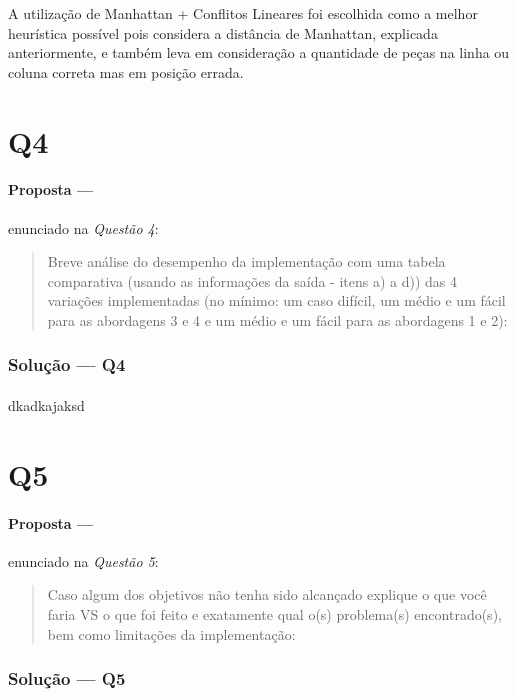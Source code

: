 \documentclass[12pt]{article}
\begin{document}
A utilização de Manhattan + Conflitos Lineares foi escolhida como a melhor heurística possível pois considera a distância de Manhattan, explicada anteriormente, e também leva em consideração a quantidade de peças na linha ou coluna correta mas em posição errada.

\section{Q4}

\paragraph{Proposta ---} enunciado na \textit{Questão 4}:

\begin{quote}
Breve análise do desempenho da implementação com uma tabela comparativa (usando as informações da saída - itens a) a d)) das 4 variações implementadas (no mínimo: um caso difícil, um médio e um fácil para as abordagens 3 e 4 e um médio e um fácil para as abordagens 1 e 2):
\end{quote}

\subsubsection{Solução --- \textbf{Q4}}

\paragraph{}
dkadkajaksd

\section{Q5}

\paragraph{Proposta ---} enunciado na \textit{Questão 5}:

\begin{quote}
Caso algum dos objetivos não tenha sido alcançado explique o que você faria VS o que foi feito e exatamente qual o(s)
  problema(s) encontrado(s), bem como  limitações da implementação:
\end{quote}

\subsubsection{Solução --- \textbf{Q5}}
\end{document}
